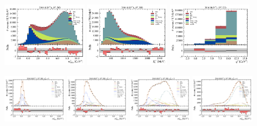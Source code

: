 \begin{figure}[htb]
    \centering
    \includegraphics[width=0.32\textwidth]{./figs-fit-fit-results/ctrl-fit/stacked/fit_result-stacked-D0-dd-mmiss2.pdf}
    \includegraphics[width=0.32\textwidth]{./figs-fit-fit-results/ctrl-fit/stacked/fit_result-stacked-D0-dd-el.pdf}
    \includegraphics[width=0.32\textwidth]{./figs-fit-fit-results/ctrl-fit/stacked/fit_result-stacked-D0-dd-q2.pdf}

    \includegraphics[width=0.24\textwidth]{./figs-fit-fit-results/ctrl-fit/lines_q2_slices/fit_result-lines_q2_idx1-D0-dd-mmiss2.pdf}
    \includegraphics[width=0.24\textwidth]{./figs-fit-fit-results/ctrl-fit/lines_q2_slices/fit_result-lines_q2_idx2-D0-dd-mmiss2.pdf}
    \includegraphics[width=0.24\textwidth]{./figs-fit-fit-results/ctrl-fit/lines_q2_slices/fit_result-lines_q2_idx3-D0-dd-mmiss2.pdf}
    \includegraphics[width=0.24\textwidth]{./figs-fit-fit-results/ctrl-fit/lines_q2_slices/fit_result-lines_q2_idx4-D0-dd-mmiss2.pdf}


\end{figure}
